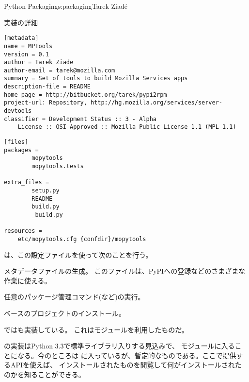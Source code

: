 \begin{aosachapter}{Python Packaging}{s:packaging}{Tarek Ziad\'{e}}
\begin{aosasect1}{実装の詳細}
\begin{verbatim}
[metadata]
name = MPTools
version = 0.1
author = Tarek Ziade
author-email = tarek@mozilla.com
summary = Set of tools to build Mozilla Services apps
description-file = README
home-page = http://bitbucket.org/tarek/pypi2rpm
project-url: Repository, http://hg.mozilla.org/services/server-devtools
classifier = Development Status :: 3 - Alpha
    License :: OSI Approved :: Mozilla Public License 1.1 (MPL 1.1)
\end{verbatim}

\begin{verbatim}
[files]
packages =
        mopytools
        mopytools.tests

extra_files =
        setup.py
        README
        build.py
        _build.py

resources =
    etc/mopytools.cfg {confdir}/mopytools
\end{verbatim}

\noindent
{}は、この設定ファイルを使って次のことを行う。

\begin{aosaitemize}

  \item メタデータファイルの生成。
  このファイルは、PyPIへの登録などのさまざまな作業に使える。

  \item 任意のパッケージ管理コマンド(など)の実行。

  \item {}ベースのプロジェクトのインストール。

\end{aosaitemize}

\noindent
{}ではも実装している。
これはモジュールを利用したものだ。

の実装はPython 3.3で標準ライブラリ入りする見込みで、
モジュールに入ることになる。今のところは
に入っているが、暫定的なものである。ここで提供するAPIを使えば、
インストールされたものを閲覧して何がインストールされたのかを知ることができる。


\end{aosasect1}
\end{aosachapter}
